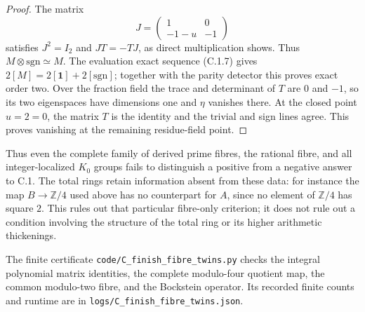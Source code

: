 \begin{proof}
The matrix
\[
 J=\begin{pmatrix}1&0\\-1-u&-1\end{pmatrix}
\]
satisfies $J^2=I_2$ and $JT=-TJ$, as direct multiplication shows.
Thus $M\otimes\mathrm{sgn}\simeq M$. The evaluation exact sequence
\textup{(C.1.7)} gives $2[M]=2[\mathbf1]+2[\mathrm{sgn}]$;
together with the parity detector this proves exact order two.
Over the fraction field the trace and determinant of $T$ are $0$
and $-1$, so its two eigenspaces have dimensions one and $\eta$
vanishes there. At the closed point $u=2=0$, the matrix $T$ is the
identity and the trivial and sign lines agree. This proves vanishing
at the remaining residue-field point.
\end{proof}

Thus even the complete family of derived prime fibres, the rational
fibre, and all integer-localized $K_0$ groups fails to distinguish a
positive from a negative answer to C.1. The total rings retain
information absent from these data: for instance the map
$B\to\mathbb Z/4$ used above has no counterpart for $A$, since no
element of $\mathbb Z/4$ has square $2$. This rules out that
particular fibre-only criterion; it does not rule out a condition
involving the structure of the total ring or its higher arithmetic
thickenings.

The finite certificate \texttt{code/C\_finish\_fibre\_twins.py}
checks the integral polynomial matrix identities, the complete
modulo-four quotient map, the common modulo-two fibre, and the
Bockstein operator. Its recorded finite counts and runtime are in
\texttt{logs/C\_finish\_fibre\_twins.json}.
